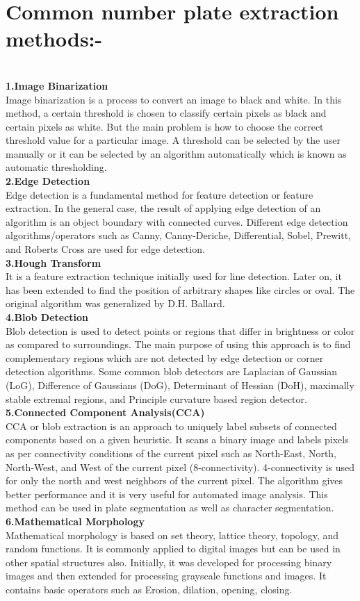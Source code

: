 \documentclass[12pt,a4paper]{report}
\begin{document}
\section{\textbf{Common number plate extraction methods:-}}\\
\textbf{1.Image Binarization}\\
	Image binarization is a process to convert an image to black and white. In this method, a certain threshold is chosen to classify certain pixels as black and certain pixels as white. But the main problem is how to choose the correct threshold value for a particular image. A threshold can be selected by the user manually or it can be selected by an algorithm automatically which is known as automatic thresholding.\\
\textbf{2.Edge Detection}\\
	Edge detection is a fundamental method for feature detection or feature extraction. In the general case, the result of applying edge detection of an algorithm is an object boundary with connected curves. Different edge detection algorithms/operators such as Canny, Canny-Deriche, Differential, Sobel, Prewitt, and Roberts Cross are used for edge detection.\\
\textbf{3.Hough Transform}\\
	It is a feature extraction technique initially used for line detection. Later on, it has been extended to find the position of arbitrary shapes like circles or oval. The original algorithm was generalized by D.H. Ballard.\\
\textbf{4.Blob Detection}\\
	Blob detection is used to detect points or regions that differ in brightness or color as compared to surroundings. The main purpose of using this approach is to find complementary regions which are not detected by edge detection or corner detection algorithms. Some common blob detectors are Laplacian of Gaussian (LoG), Difference of Gaussians (DoG), Determinant of Hessian (DoH), maximally stable extremal regions, and Principle curvature based region detector.\\
\textbf{5.Connected Component Analysis(CCA)}\\
	CCA or blob extraction is an approach to uniquely label subsets of connected components based on a given heuristic. It scans a binary image and labels pixels as per connectivity conditions of the current pixel such as North-East, North, North-West, and West of the current pixel (8-connectivity). 4-connectivity is used for only the north and west neighbors of the current pixel. The algorithm gives better performance and it is very useful for automated image analysis. This method can be used in plate segmentation as well as character segmentation.\\
\textbf{6.Mathematical Morphology}\\
	Mathematical morphology is based on set theory, lattice theory, topology, and random functions. It is commonly applied to digital images but can be used in other spatial structures also. Initially, it was developed for processing binary images and then extended for processing grayscale functions and images. It contains basic operators such as Erosion, dilation, opening, closing.\\
\end{document}
